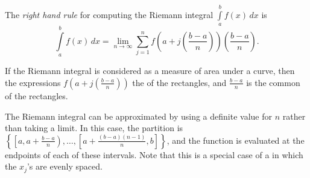 \documentclass[12pt]{article}
\begin{document}
The \emph{right hand rule} for computing the Riemann integral $\displaystyle \int\limits_a^b f(x) \, dx$ is
\[
\int\limits_a^b f(x) \, dx = \lim_{n \to \infty} \sum_{j=1}^n f \left( a+j \left( \frac{b-a}{n} \right) \right) \left( \frac{b-a}{n} \right).
\]

If the Riemann integral is considered as a measure of area under a curve, then the expressions $\displaystyle f \left( a+j \left( \frac{b-a}{n} \right) \right)$  the  of the rectangles, and $\displaystyle \frac{b-a}{n}$ is the common  of the rectangles.

The Riemann integral can be approximated by using a definite value for $n$ rather than taking a limit.  In this case, the partition is $\displaystyle \left\{ \left[ a, a+\frac{b-a}{n} \right), \dots , \left[ a+\frac{(b-a)(n-1)}{n}, b \right] \right\}$, and the function is evaluated at the  endpoints of each of these intervals.  Note that this is a special case of a  in which the $x_j$'s are evenly spaced.
\end{document}
